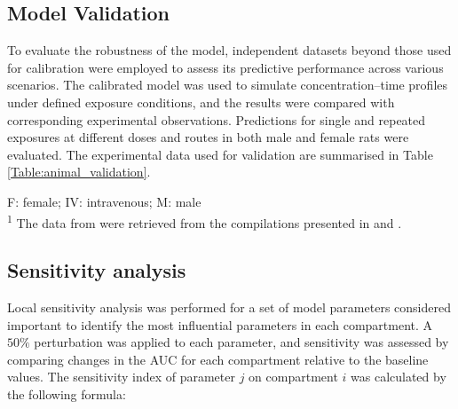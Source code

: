 \documentclass[preprint,12pt,authoryear]{elsarticle}
\begin{document}
\subsection{Model  Validation}
To evaluate the robustness of the model, independent datasets beyond those used for calibration were employed to assess its predictive performance across various scenarios. The calibrated model was used to simulate concentration–time profiles under defined exposure conditions, and the results were compared with corresponding experimental observations. Predictions for single and repeated exposures at different doses and routes in both male and female rats were evaluated. The experimental data used for validation are summarised in Table \ref{Table:animal_validation}.

\begin{table}[H]
\centering
\caption{Animal studies used for model validation.}
\label{Table:animal_validation}

\raggedright
\footnotesize
\vspace{0.5em}
\raggedright
\scriptsize
F: female; IV: intravenous; M: male\\
\textsuperscript{1} The data from \citet{kemper_2003} were retrieved from the compilations presented in \citet{loccisano_2012} and \citet{worley_2015}. 
\\
\end{table}


\subsection{Sensitivity analysis}
Local sensitivity analysis was performed for a set of model parameters considered important to identify the most influential parameters in each compartment. A $50\%$ perturbation was applied to each parameter, and sensitivity was assessed by comparing changes in the AUC for each compartment relative to the baseline values. The sensitivity index of parameter $j$ on compartment $i$ was calculated by the following formula:
\end{document}
